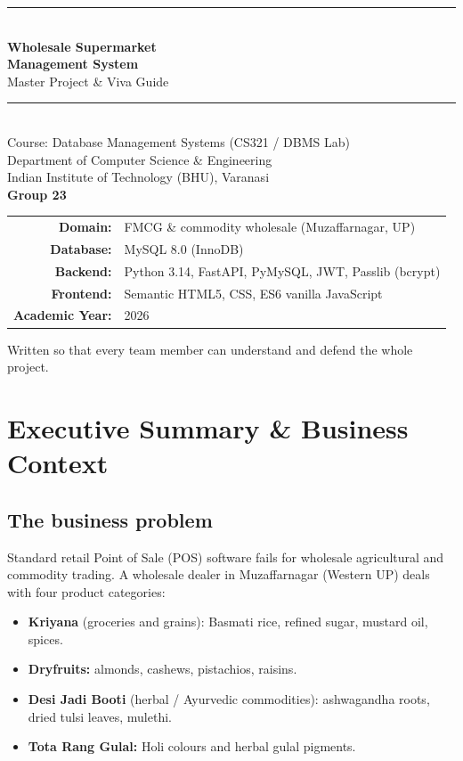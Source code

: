 \documentclass[10pt,a4paper]{article}
\begin{document}
\begin{titlepage}
\centering
\vspace*{2.2cm}
{\color{primary}\rule{\textwidth}{1.2pt}}\\[1.2em]
{\Huge\bfseries\color{primary} Wholesale Supermarket\\[0.3em] Management System}\\[0.8em]
{\Large\color{secondary} Master Project \& Viva Guide}\\[1.2em]
{\color{primary}\rule{\textwidth}{1.2pt}}\\[2.5em]
{\large Course: Database Management Systems (CS321 / DBMS Lab)}\\[0.4em]
{\large Department of Computer Science \& Engineering\\ Indian Institute of Technology (BHU), Varanasi}\\[1.4em]
{\Large\bfseries Group 23}\\[2em]
\begin{tabular}{rl}
\textbf{Domain:} & FMCG \& commodity wholesale (Muzaffarnagar, UP)\\
\textbf{Database:} & MySQL 8.0 (InnoDB)\\
\textbf{Backend:} & Python 3.14, FastAPI, PyMySQL, JWT, Passlib (bcrypt)\\
\textbf{Frontend:} & Semantic HTML5, CSS, ES6 vanilla JavaScript\\
\textbf{Academic Year:} & 2026
\end{tabular}
\vfill
{\small\color{gray} Written so that every team member can understand and defend the whole project.}
\end{titlepage}

\tableofcontents
\newpage

\section{Executive Summary \& Business Context}
\subsection{The business problem}
Standard retail Point of Sale (POS) software fails for wholesale agricultural and commodity trading. A wholesale dealer in Muzaffarnagar (Western UP) deals with four product categories:
\begin{itemize}
  \item \textbf{Kriyana} (groceries and grains): Basmati rice, refined sugar, mustard oil, spices.
  \item \textbf{Dryfruits:} almonds, cashews, pistachios, raisins.
  \item \textbf{Desi Jadi Booti} (herbal / Ayurvedic commodities): ashwagandha roots, dried tulsi leaves, mulethi.
  \item \textbf{Tota Rang Gulal:} Holi colours and herbal gulal pigments.
\end{itemize}
\end{document}
